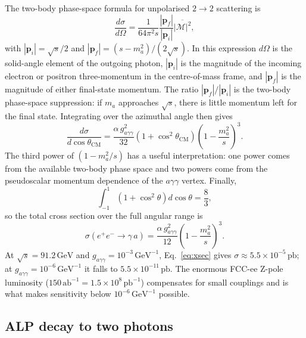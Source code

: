 \documentclass[12pt,a4paper]{article}
\newcommand{\alp}{a}
\newcommand{\gagg}{g_{a\gamma\gamma}}
\newcommand{\ma}{m_a}
\newcommand{\sqrts}{\sqrt{s}}
\newcommand{\GeV}{\,\text{GeV}}
\newcommand{\abinv}{\,\text{ab}^{-1}}
\newcommand{\pbinv}{\,\text{pb}^{-1}}
\begin{document}
The two-body phase-space formula for unpolarised $2\to2$ scattering is
\begin{equation}
    \frac{d\sigma}{d\Omega}
    =
    \frac{1}{64\pi^2s}
    \frac{|\mathbf{p}_f|}{|\mathbf{p}_i|}
    \overline{|\mathcal{M}|^2},
    \label{eq:two_body_xsec}
\end{equation}
with $|\mathbf{p}_i|=\sqrts/2$ and
$|\mathbf{p}_f|=(s-\ma^2)/(2\sqrts)$. In this expression $d\Omega$ is the
solid-angle element of the outgoing photon, $|\mathbf{p}_i|$ is the magnitude
of the incoming electron or positron three-momentum in the centre-of-mass
frame, and $|\mathbf{p}_f|$ is the magnitude of either final-state momentum.
The ratio $|\mathbf{p}_f|/|\mathbf{p}_i|$ is the two-body phase-space
suppression: if $\ma$ approaches $\sqrts$, there is little momentum left for
the final state. Integrating over the azimuthal angle then gives
\begin{equation}
    \frac{d\sigma}{d\cos\theta_\mathrm{CM}}
    =
    \frac{\alpha\,\gagg^2}{32}
    \left(1+\cos^2\theta_\mathrm{CM}\right)
    \left(1-\frac{\ma^2}{s}\right)^3.
    \label{eq:dsigma_dcostheta}
\end{equation}
The third power of $(1-\ma^2/s)$ has a useful interpretation: one power comes
from the available two-body phase space and two powers come from the
pseudoscalar momentum dependence of the $a\gamma\gamma$ vertex. Finally,
\begin{equation}
    \int_{-1}^{1}
    \left(1+\cos^2\theta\right)d\cos\theta
    =
    \frac{8}{3},
\end{equation}
so the total cross section over the full angular range is
\begin{equation}
    \sigma(e^+e^-\to\gamma\,\alp)
    =
    \frac{\alpha\,\gagg^2}{12}
    \left(1 - \frac{\ma^2}{s}\right)^3.
    \label{eq:xsec}
\end{equation}
At $\sqrts = 91.2\GeV$ and $\gagg = 10^{-3}\GeV^{-1}$,
Eq.~\eqref{eq:xsec} gives $\sigma \approx 5.5\times10^{-5}\,\text{pb}$;
at $\gagg = 10^{-6}\GeV^{-1}$ it falls to
$5.5\times10^{-11}\,\text{pb}$. The enormous FCC-ee Z-pole luminosity
($150\abinv = 1.5\times10^{8}\pbinv$) compensates for small couplings and is
what makes sensitivity below $10^{-6}\GeV^{-1}$ possible.

\subsection{ALP decay to two photons}
\end{document}
